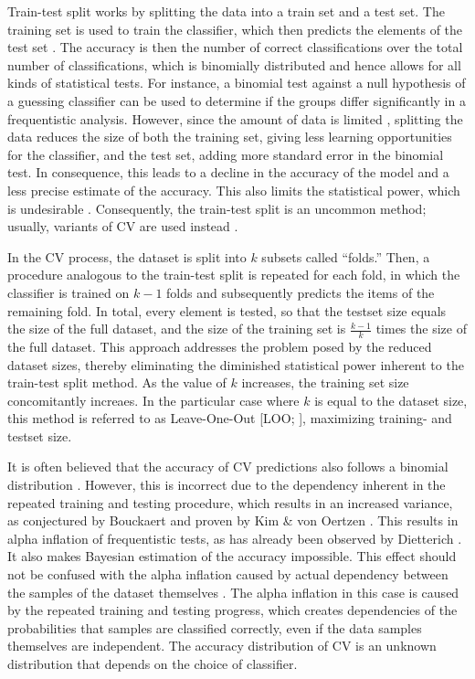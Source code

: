 \documentclass[article]{jss}
\begin{document}
Train-test split works by splitting the data into a train set and a test set.
The training set is used to train the classifier, which then predicts the elements of the test set \citep{kohavi_study_1995}.
The accuracy is then the number of correct classifications over the total number of classifications, which is binomially distributed and hence allows for all kinds of statistical tests. For instance, a binomial test against a null hypothesis of a guessing classifier can be used to determine if the groups differ significantly in a frequentistic analysis.
However, since the amount of data is limited \citep{sahiner_classifier_2008}, splitting the data reduces the size of both the training set, giving less learning opportunities for the classifier, and the test set, adding more standard error in the binomial test.
In consequence, this leads to a decline in the accuracy of the model \citep{santafe_dealing_2015} and a less precise estimate of the accuracy. This also limits the statistical power, which is undesirable \citep{rossi_statistical_2013}.
Consequently, the train-test split is an uncommon method; usually, variants of CV are used instead \citep{kohavi_study_1995, devroye_distribution-free_1979, geisser_predictive_1975, stone_cross-validatory_1974}.

In the CV process, the dataset is split into $k$ subsets called ``folds.'' Then, a procedure analogous to the train-test split is repeated for each fold, in which the classifier is trained on $k-1$ folds and subsequently predicts the items of the remaining fold. In total, every element is tested, so that the testset size equals the size of the full dataset, and the size of the training set is $\frac{k-1}{k}$ times the size of the full dataset. This approach addresses the problem posed by the reduced dataset sizes, thereby eliminating the diminished statistical power inherent to the train-test split method. As the value of $k$ increases, the training set size concomitantly increaes. In the particular case where $k$ is equal to the dataset size, this method is referred to as Leave-One-Out [LOO; \citep{hastie2009elements}], maximizing training- and testset size.

It is often believed that the accuracy of CV predictions also follows a binomial distribution \citep{salzberg_comparing_1997}.
However, this is incorrect due to the dependency inherent in the repeated training and testing procedure, which results in an increased variance, as conjectured by Bouckaert \citep{bouckaert_choosing_2003} and proven by Kim \& von Oertzen \citep{independent_validation}.
This results in alpha inflation of frequentistic tests, as has already been observed by Dietterich \citep{dietterich_approximate_1998}. It also makes Bayesian estimation of the accuracy impossible. This effect should not be confused with the alpha inflation caused by actual dependency between the samples of the dataset themselves \citep{kohavi_study_1995}. The alpha inflation in this case is caused by the repeated training and testing progress, which creates dependencies of the probabilities that samples are classified correctly, even if the data samples themselves are independent.
The accuracy distribution of CV is an unknown distribution that depends on the choice of classifier.
\end{document}

